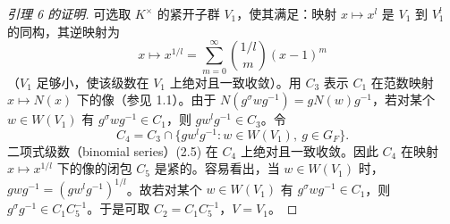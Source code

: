 \begin{proof}[引理 6 的证明]
可选取 $K^\times$ 的紧开子群 $V_1$，使其满足：映射 $x\mapsto x^l$ 是 $V_1$ 到 $V_1^l$ 的同构，其逆映射为
\begin{equation}
 x\longmapsto x^{1/l}=\sum_{m=0}^\infty\binom{1/l}{m}(x-1)^m
 \tag{2.5}
\end{equation}
（$V_1$ 足够小，使该级数在 $V_1$ 上绝对且一致收敛）。用 $C_3$ 表示 $C_1$ 在范数映射 $x\mapsto N(x)$ 下的像（参见 1.1）。由于 $N(g^\sigma wg^{-1})=gN(w)g^{-1}$，若对某个 $w\in W(V_1)$ 有 $g^\sigma wg^{-1}\in C_1$，则 $gw^lg^{-1}\in C_3$。令
\[
 C_4=C_3\cap\{gw^lg^{-1}:w\in W(V_1),\ g\in G_F\}.
\]
二项式级数（binomial series）(2.5) 在 $C_4$ 上绝对且一致收敛。因此 $C_4$ 在映射 $x\mapsto x^{1/l}$ 下的像的闭包 $C_5$ 是紧的。容易看出，当 $w\in W(V_1)$ 时，$gwg^{-1}=(gw^lg^{-1})^{1/l}$。故若对某个 $w\in W(V_1)$ 有 $g^\sigma wg^{-1}\in C_1$，则 $g^\sigma g^{-1}\in C_1C_5^{-1}$。于是可取 $C_2=C_1C_5^{-1}$，$V=V_1$。
\end{proof}

